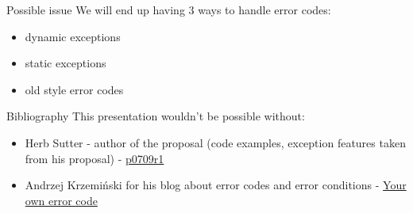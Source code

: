 \documentclass[10pt]{beamer}
\begin{document}
\begin{frame}{Possible issue}
	We will end up having 3 ways to handle error codes:
	\begin{itemize}
		\item dynamic exceptions
		\item static exceptions
		\item old style error codes
	\end{itemize}

	\vfill
\end{frame}

\begin{frame}{Bibliography}
	This presentation wouldn't be possible without:
	
	\begin{itemize}
		\item Herb Sutter - author of the proposal (code examples, exception features taken from his proposal) -  \href{http://www.open-std.org/jtc1/sc22/wg21/docs/papers/2018/p0709r1.pdf}{p0709r1}
		
		\item Andrzej Krzemiński for his blog about error codes and error conditions -  \href{https://akrzemi1.wordpress.com/2017/07/12/your-own-error-code/}{Your own error code}
	\end{itemize}
\end{frame}

\end{document}
